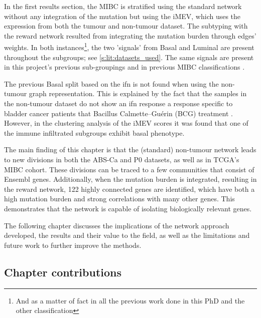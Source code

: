 In the first results section, the MIBC is stratified using the standard network without any integration of the mutation but using the iMEV, which uses the expression from both the tumour and non-tumour dataset. The subtyping with the reward network resulted from integrating the mutation burden through edges' weights. In both instances\footnote{And as a matter of fact in all the previous work done in this PhD and the other classification}, the two 'signals' from Basal and Luminal are present throughout the subgroups; see \cref{s:lit:datasets_used}. The same signals are present in this project's previous sub-groupings and in previous MIBC classifications \citep{Robertson2017-mg,Kamoun2020-tj,Marzouka2018-ge}.

The previous Basal split based on the \acrlong{ifn} is not found when using the non-tumour graph representation. This is explained by the fact that the samples in the non-tumour dataset do not show an \acrshort{ifn} response a response specific to bladder cancer patients that Bacillus Calmette–Guérin (BCG) treatment \citep{Baker2022-bj}. However,  in the clustering analysis of the iMEV scores it was found that one of the immune infiltrated subgroups exhibit basal phenotype.

The main finding of this chapter is that the (standard) non-tumour network leads to new divisions in both the ABS-Ca and P0 datasets, as well as in TCGA's MIBC cohort. These divisions can be traced to a few communities that consist of Ensembl genes. Additionally, when the mutation burden is integrated, resulting in the reward network, 122 highly connected genes are identified, which have both a high mutation burden and strong correlations with many other genes. This demonstrates that the network is capable of isolating biologically relevant genes.

The following chapter discusses the implications of the network approach developed, the results and their value to the field, as well as the limitations and future work to further improve the methods.

\subsection{Chapter contributions}

